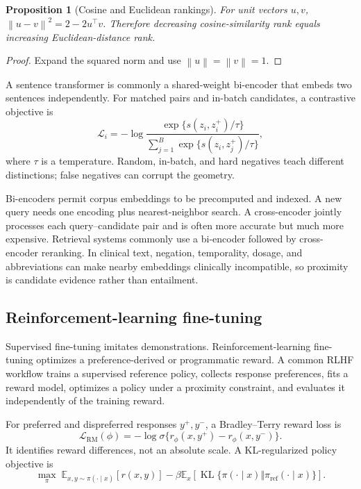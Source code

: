 \documentclass[12pt,oneside]{book}
\numberwithin{equation}{section}
\theoremstyle{definition}
\theoremstyle{plain}
\newtheorem{proposition}{Proposition}[section]
\theoremstyle{remark}
\newcommand{\E}{\mathbb{E}}
\newcommand{\norm}[1]{\left\lVert #1 \right\rVert}
\begin{document}
\begin{proposition}[Cosine and Euclidean rankings]
For unit vectors $u,v$, $\norm{u-v}^2=2-2u^\top v$.  Therefore decreasing
cosine-similarity rank equals increasing Euclidean-distance rank.
\end{proposition}
\begin{proof}
Expand the squared norm and use $\norm u=\norm v=1$.
\end{proof}

A sentence transformer is commonly a shared-weight bi-encoder that embeds two
sentences independently.  For matched pairs and in-batch candidates, a
contrastive objective is
\begin{equation}
 \mathcal L_i=-\log
 \frac{\exp\{s(z_i,z_i^+)/\tau\}}
      {\sum_{j=1}^B\exp\{s(z_i,z_j^+)/\tau\}},
 \label{eq:sentence-contrastive-loss}
\end{equation}
where $\tau$ is a temperature.  Random, in-batch, and hard negatives teach
different distinctions; false negatives can corrupt the geometry.

Bi-encoders permit corpus embeddings to be precomputed and indexed.  A new
query needs one encoding plus nearest-neighbor search.  A cross-encoder jointly
processes each query--candidate pair and is often more accurate but much more
expensive.  Retrieval systems commonly use a bi-encoder followed by
cross-encoder reranking.  In clinical text, negation, temporality, dosage, and
abbreviations can make nearby embeddings clinically incompatible, so proximity
is candidate evidence rather than entailment.

\subsection{Reinforcement-learning fine-tuning}

Supervised fine-tuning imitates demonstrations.  Reinforcement-learning
fine-tuning optimizes a preference-derived or programmatic reward.  A common
RLHF workflow trains a supervised reference policy, collects response
preferences, fits a reward model, optimizes a policy under a proximity
constraint, and evaluates it independently of the training reward.

For preferred and dispreferred responses $y^+,y^-$, a Bradley--Terry reward
loss is
\[
 \mathcal L_{\mathrm{RM}}(\phi)
 =-\log\sigma\{r_\phi(x,y^+)-r_\phi(x,y^-)\}.
\]
It identifies reward differences, not an absolute scale.  A KL-regularized
policy objective is
\begin{equation}
 \max_\pi\;
 \E_{x,y\sim\pi(\cdot\mid x)}[r(x,y)]
 -\beta\E_x\!\left[\operatorname{KL}
   \{\pi(\cdot\mid x)\Vert\pi_{\mathrm{ref}}(\cdot\mid x)\}\right].
 \label{eq:kl-regularized-rlhf}
\end{equation}
\end{document}

